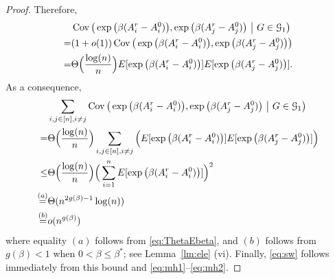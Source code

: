 \documentclass{article}
\begin{document}
\begin{proof}
Therefore,
\begin{align*}
& \operatorname{Cov} \big(\exp\big(\beta (A^r_i-A^0_i) \big), \exp\big(\beta (A^r_j-A^0_j)  \big) ~\big|~ G\in\mathcal{G}_1 \big) \\
= & (1+o(1)) \operatorname{Cov} \big(\exp\big(\beta (A^r_i-A^0_i) \big), \exp\big(\beta (A^r_j-A^0_j)  \big) \big) \\
= & \Theta\Big( \frac{\log(n)}{n} \Big) E[\exp\big(\beta (A^r_i-A^0_i) \big)] E[\exp\big(\beta (A^r_j-A^0_j) \big)] .
\end{align*}
As a consequence,
\begin{align*}
& \sum_{i,j\in[n],i\neq j}
\operatorname{Cov} \big(\exp\big(\beta (A^r_i-A^0_i) \big), \exp\big(\beta (A^r_j-A^0_j) \big) ~\big|~ G\in\mathcal{G}_1 \big) \\
= & \Theta\Big( \frac{\log(n)}{n} \Big) \sum_{i,j\in[n],i\neq j} \Big( E[\exp\big(\beta (A^r_i-A^0_i) \big)] E[\exp\big(\beta (A^r_j-A^0_j) \big)] \Big) \\
\le & \Theta\Big( \frac{\log(n)}{n} \Big)
\Big(\sum_{i=1}^n  E[\exp\big(\beta (A^r_i-A^0_i) \big)] \Big)^2 \\
\overset{(a)}{=} & \Theta(n^{2g(\beta)-1} \log(n)) \\
\overset{(b)}{=} & o(n^{g(\beta)})
\end{align*}
where equality $(a)$ follows from \eqref{eq:ThetaEbeta}, and $(b)$ follows from $g(\beta)<1$ when $0<\beta\le\beta^\ast$; see Lemma~\ref{lm:ele} (vi).
Finally, \eqref{eq:sw} follows immediately from this bound and \eqref{eq:mh1}--\eqref{eq:mh2}.
\end{proof}
\end{document}
